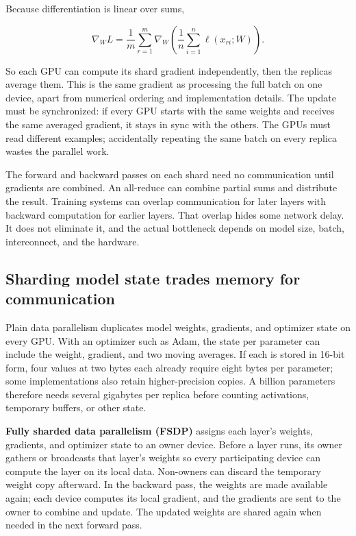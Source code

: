 Because differentiation is linear over sums,

\[
\nabla_W L=\frac{1}{m}\sum_{r=1}^{m}\nabla_W\left(\frac{1}{n}\sum_{i=1}^{n}\ell(x_{ri};W)\right).
\]

So each GPU can compute its shard gradient independently, then the replicas average them. This is the same gradient as processing the full batch on one device, apart from numerical ordering and implementation details. The update must be synchronized: if every GPU starts with the same weights and receives the same averaged gradient, it stays in sync with the others. The GPUs must read different examples; accidentally repeating the same batch on every replica wastes the parallel work.

The forward and backward passes on each shard need no communication until gradients are combined. An all-reduce can combine partial sums and distribute the result. Training systems can overlap communication for later layers with backward computation for earlier layers. That overlap hides some network delay. It does not eliminate it, and the actual bottleneck depends on model size, batch, interconnect, and the hardware.

\subsection{Sharding model state trades memory for communication}\label{04-visual-computing-ii-ch031-sharding-model-state-trades-memory-for-communication}

\hypertarget{04-visual-computing-ii-ch031-sharding-model-state-trades-memory-for-communication}{}

Plain data parallelism duplicates model weights, gradients, and optimizer state on every GPU. With an optimizer such as Adam, the state per parameter can include the weight, gradient, and two moving averages. If each is stored in 16-bit form, four values at two bytes each already require eight bytes per parameter; some implementations also retain higher-precision copies. A billion parameters therefore needs several gigabytes per replica before counting activations, temporary buffers, or other state.

\textbf{Fully sharded data parallelism (FSDP)} assigns each layer's weights, gradients, and optimizer state to an owner device. Before a layer runs, its owner gathers or broadcasts that layer's weights so every participating device can compute the layer on its local data. Non-owners can discard the temporary weight copy afterward. In the backward pass, the weights are made available again; each device computes its local gradient, and the gradients are sent to the owner to combine and update. The updated weights are shared again when needed in the next forward pass.

